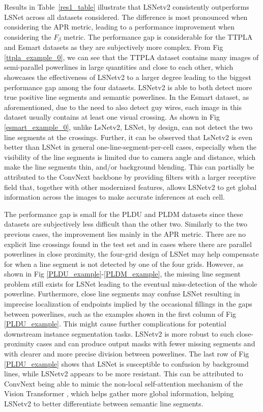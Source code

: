 \documentclass[journal]{IEEEtran}
\begin{document}
 Results in Table~\ref{res1_table} illustrate that LSNetv2 consistently outperforms LSNet across all datasets considered. The difference is most pronounced when considering the APR metric, leading to a performance improvement when considering the $F_{\beta}$ metric. The performance gap is considerable for the TTPLA and Esmart datasets as they are subjectively more complex.  From Fig \ref{ttpla_example_0}, we can see that the TTPLA dataset contains many images of semi-parallel powerlines in large quantities and close to each other, which showcases the effectiveness of LSNetv2 to a larger degree leading to the biggest performance gap among the four datasets. LSNetv2 is able to both detect more true positive line segments and semantic powerlines. In the Esmart dataset, as aforementioned, due to the need to also detect guy wires, each image in this dataset usually contains at least one visual crossing. As shown in Fig \ref{esmart_example_0}, unlike LsNetv2, LSNet, by design, can not detect the two line segments at the crossings. Further, it can be observed that LsNetv2 is even better than LSNet in general one-line-segment-per-cell cases, especially when the visibility of the line segments is limited due to camera angle and distance, which make the line segments thin, and/or background blending. This can partially be attributed to the ConvNext backbone by providing filters with a larger receptive field that, together with other modernized features, allows LSNetv2 to get global information across the images to make accurate inferences at each cell.
 
 The performance gap is small for the PLDU and PLDM datasets since these datasets are subjectively less difficult than the other two. Similarly to the two previous cases, the improvement lies mainly in the APR metric. There are no explicit line crossings found in the test set and in cases where there are parallel powerlines in close proximity, the four-grid design of LSNet may help compensate for when a line segment is not detected by one of the four grids. However, as shown in Fig \ref{PLDU_example}-\ref{PLDM_example}, the missing line segment problem still exists for LSNet leading to the eventual miss-detection of the whole powerline. Furthermore, close line segments may confuse LSNet resulting in imprecise localization of endpoints implied by the occasional fillings in the gaps between powerlines, such as the examples shown in the first column of Fig \ref{PLDU_example}. This might cause further complications for potential downstream instance segmentation tasks. LSNetv2 is more robust to such close-proximity cases and can produce output masks with fewer missing segments and with clearer and more precise division between powerlines. The last row of Fig \ref{PLDU_example} shows that LSNet is susceptible to confusion by background lines, while LSNetv2 appears to be more resistant. This can be attributed to ConvNext being able to mimic the non-local self-attention mechanism of the Vision Transformer \cite{vit}, which helps gather more global information, helping LSNetv2 to better differentiate between semantic line segments.
\end{document}
